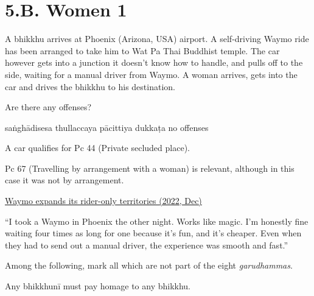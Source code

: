 \chapter{5.B. Women 1}
\renewcommand*{\theChapterTitle}{5.B. Women 1}

\begin{exam}{\autoExamName}

\begin{problem}

  A bhikkhu arrives at Phoenix (Arizona, USA) airport. A self-driving Waymo ride
  has been arranged to take him to Wat Pa Thai Buddhist temple. The car however
  gets into a junction it doesn't know how to handle, and pulls off to the side,
  waiting for a manual driver from Waymo. A woman arrives, gets into the car and
  drives the bhikkhu to his destination.

  Are there any offenses?

  \begin{answers}{5}
    \bChoices
     saṅghādisesa\eAns
     thullaccaya\eAns
     pācittiya\eAns
     dukkaṭa\eAns
     no offenses\eAns
    \eChoices
  \end{answers}

  \begin{solution}
    A car qualifies for Pc 44 (Private secluded place).

    Pc 67 (Travelling by arrangement with a woman) is relevant, although in this case it was not by arrangement.

    \href{https://news.ycombinator.com/item?id=34038562}{Waymo expands its rider-only territories (2022, Dec)}

    ``I took a Waymo in Phoenix the other night. Works like magic. I’m honestly
    fine waiting four times as long for one because it’s fun, and it’s cheaper.
    Even when they had to send out a manual driver, the experience was smooth
    and fast.''
  \end{solution}

\end{problem}

\problemDivide

\begin{problem}
  Among the following, mark all which are not part of the eight \emph{garudhammas}.

  \begin{manswers}{1}
    \bChoices

     Any bhikkhunī must pay homage to any bhikkhu. \eAns


\end{manswers}
\end{problem}
\end{exam}

